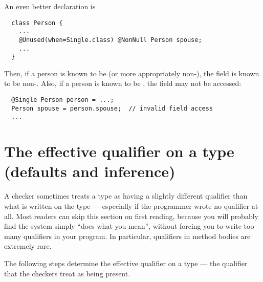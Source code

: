 An even better declaration is

\begin{Verbatim}
  class Person {
    ...
    @Unused(when=Single.class) @NonNull Person spouse;
    ...
  }
\end{Verbatim}

Then, if a person is known to be  (or more
appropriately non-), the  field is known to
be non-.  Also, if a person is known to be ,
the  field may not be accessed:
 
\begin{Verbatim}
  @Single Person person = ...;
  Person spouse = person.spouse;  // invalid field access
  ...
\end{Verbatim}


\section{The effective qualifier on a type (defaults and inference)\label{effective-qualifier}}

A checker sometimes treats a type as having a slightly different qualifier
than what is written on the type --- especially if the programmer wrote no
qualifier at all.
Most readers can skip this section on first reading, because you will
probably find the system simply ``does what you mean'', without forcing
you to write too many qualifiers in your program.
In particular, qualifiers in method bodies are extremely rare.

  The following steps determine the effective
qualifier on a type --- the qualifier that the checkers treat as being present.

